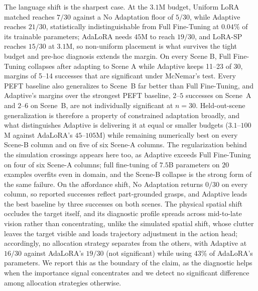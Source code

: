 The language shift is the sharpest case.
At the $3.1$M budget, Uniform LoRA matched reaches $7/30$ against a No Adaptation floor of $5/30$, while Adaptive reaches $21/30$, statistically indistinguishable from Full Fine-Tuning at $0.04\%$ of its trainable parameters; AdaLoRA needs $45$M to reach $19/30$, and LoRA-SP reaches $15/30$ at $3.1$M, so non-uniform placement is what survives the tight budget and pre-hoc diagnosis extends the margin.
On every Scene B, Full Fine-Tuning collapses after adapting to Scene A while Adaptive keeps 11--23 of 30, margins of 5--14 successes that are significant under McNemar's test.
Every PEFT baseline also generalizes to Scene~B far better than Full Fine-Tuning, and Adaptive's margins over the strongest PEFT baseline, $2$--$5$ successes on Scene~A and $2$--$6$ on Scene~B, are not individually significant at $n = 30$.
Held-out-scene generalization is therefore a property of constrained adaptation broadly, and what distinguishes Adaptive is delivering it at equal or smaller budgets ($3.1$--$100$M against AdaLoRA's $45$--$105$M) while remaining numerically best on every Scene-B column and on five of six Scene-A columns.
The regularization behind the simulation crossings appears here too, as Adaptive exceeds Full Fine-Tuning on four of six Scene-A columns; full fine-tuning of $7.5$B parameters on $20$ examples overfits even in domain, and the Scene-B collapse is the strong form of the same failure.
On the affordance shift, No Adaptation returns $0/30$ on every column, so reported successes reflect part-grounded grasps, and Adaptive leads the best baseline by three successes on both scenes.
The physical spatial shift occludes the target itself, and its diagnostic profile spreads across mid-to-late vision rather than concentrating, unlike the simulated spatial shift, whose clutter leaves the target visible and loads trajectory adjustment in the action head; accordingly, no allocation strategy separates from the others, with Adaptive at $16/30$ against AdaLoRA's $19/30$ (not significant) while using $43\%$ of AdaLoRA's parameters.
We report this as the boundary of the claim, as the diagnostic helps when the importance signal concentrates and we detect no significant difference among allocation strategies otherwise.